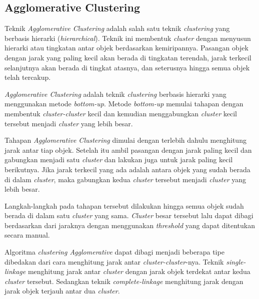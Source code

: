 \subsection{Agglomerative Clustering}
\label{subsec:clustering_agglomerative}
Teknik \textit{Agglomerative Clustering} adalah salah satu teknik \textit{clustering} yang berbasis hierarki (\textit{hierarchical}). Teknik ini membentuk \textit{cluster} dengan menyusun hierarki atau tingkatan antar objek berdasarkan kemiripannya. Pasangan objek dengan jarak yang paling kecil akan berada di tingkatan terendah, jarak terkecil selanjutnya akan berada di tingkat atasnya, dan seterusnya hingga semua objek telah tercakup. 

\textit{Agglomerative Clustering} adalah teknik \textit{clustering} berbasis hierarki yang menggunakan metode \textit{bottom-up}. Metode \textit{bottom-up} memulai tahapan dengan membentuk \textit{cluster-cluster} kecil dan kemudian menggabungkan \textit{cluster} kecil tersebut menjadi \textit{cluster} yang lebih besar.

Tahapan \textit{Agglomerative Clustering} dimulai dengan terlebih dahulu menghitung jarak antar tiap objek. Setelah itu ambil pasangan dengan jarak paling kecil dan gabungkan menjadi satu \textit{cluster} dan lakukan juga untuk jarak paling kecil berikutnya. Jika jarak terkecil yang ada adalah antara objek yang sudah berada di dalam \textit{cluster}, maka gabungkan kedua \textit{cluster} tersebut menjadi \textit{cluster} yang lebih besar. 

Langkah-langkah pada tahapan tersebut dilakukan hingga semua objek sudah berada di dalam satu \textit{cluster} yang sama. \textit{Cluster} besar tersebut lalu dapat dibagi berdasarkan dari jaraknya dengan menggunakan \textit{threshold} yang dapat ditentukan secara manual.

Algoritma \textit{clustering Agglomerative} dapat dibagi menjadi beberapa tipe dibedakan dari cara menghitung jarak antar \textit{cluster-cluster}-nya. Teknik \textit{single-linkage} menghitung jarak antar \textit{cluster} dengan jarak objek terdekat antar kedua \textit{cluster} tersebut. Sedangkan teknik \textit{complete-linkage} menghitung jarak dengan jarak objek terjauh antar dua \textit{cluster}.

